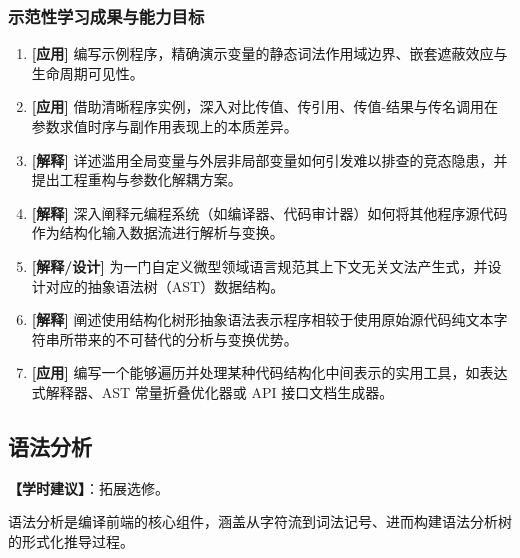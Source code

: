 \subsubsection{示范性学习成果与能力目标}
\begin{enumerate}
    \item \textbf{[应用]} 编写示例程序，精确演示变量的静态词法作用域边界、嵌套遮蔽效应与生命周期可见性。
    \item \textbf{[应用]} 借助清晰程序实例，深入对比传值、传引用、传值-结果与传名调用在参数求值时序与副作用表现上的本质差异。
    \item \textbf{[解释]} 详述滥用全局变量与外层非局部变量如何引发难以排查的竞态隐患，并提出工程重构与参数化解耦方案。
    \item \textbf{[解释]} 深入阐释元编程系统（如编译器、代码审计器）如何将其他程序源代码作为结构化输入数据流进行解析与变换。
    \item \textbf{[解释/设计]} 为一门自定义微型领域语言规范其上下文无关文法产生式，并设计对应的抽象语法树（AST）数据结构。
    \item \textbf{[解释]} 阐述使用结构化树形抽象语法表示程序相较于使用原始源代码纯文本字符串所带来的不可替代的分析与变换优势。
    \item \textbf{[应用]} 编写一个能够遍历并处理某种代码结构化中间表示的实用工具，如表达式解释器、AST 常量折叠优化器或 API 接口文档生成器。
\end{enumerate}

\subsection{语法分析}
\textbf{【学时建议】}：拓展选修。

语法分析是编译前端的核心组件，涵盖从字符流到词法记号、进而构建语法分析树的形式化推导过程。

